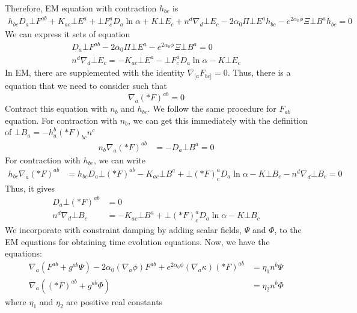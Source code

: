 \documentclass[prd]{revtex4}
\begin{document}
Therefore, EM equation with contraction $h_{bc}$ is
\begin{align}
\label{eqnem_h_contrac}
h_{bc} D_a \bot F^{ab}  + K_{ac} \bot E^a + \bot F_c^a D_a \ln \alpha + K \bot E_c + n^d \nabla_d \bot E_c -2 \alpha_0 \Pi \bot E^a h_{bc}- e^{2 \alpha_0 \phi} \Xi \bot B^a h_{bc}= 0
\end{align}
We can express it sets of equation
\begin{align}
D_a \bot F^{ab}  -2 \alpha_0 \Pi \bot E^a - e^{2 \alpha_0 \phi} \Xi \bot B^a = 0 \\
n^d \nabla_d \bot E_c = -K_{ac} \bot E^a - \bot F_c^a D_a \ln \alpha - K \bot E_c 
\end{align}
In EM, there are supplemented with the identity $\nabla_{[a} F_{bc]} = 0$. Thus, there is a equation that we need to consider such that
\begin{equation}
\nabla_a (\ast F)^{ab} = 0 
\end{equation}
Contract this equation with $n_b$ and $h_{bc}$. We follow the same procedure for $F_{ab}$ equation. For contraction with $n_b$, we can get this immediately with the definition of $\bot B_a = -h_a^b (\ast F)_{bc} n^c$
\begin{align}
\label{eqndualem}
n_b \nabla_a (\ast F)^{ab}  & = -D_a \bot B^a = 0
\end{align}
For contraction with $h_{bc}$, we can write
\begin{align}
\label{eqndualem2}
h_{bc} \nabla_a (\ast F)^{ab}  &=h_{bc} D_a \bot (\ast F)^{ab}  - K_{ac} \bot B^a + \bot (\ast F)_c^a D_a \ln \alpha - K \bot B_c - n^d \nabla_d \bot B_c = 0
\end{align}
Thus, it gives
\begin{align}
D_a \bot (\ast F)^{ab} &= 0 \\
n^d \nabla_d \bot B_c  &=- K_{ac} \bot B^a + \bot (\ast F)_c^a D_a \ln \alpha - K \bot B_c 
\end{align}
We incorporate with constraint damping by adding scalar fields, $\Psi$ and $\Phi$, to the EM equations for obtaining time evolution equations. Now, we have the equations:
\begin{align}
\label{eqnemconst1}
\nabla_a (F^{ab} + g^{ab} \Psi) - 2 \alpha_0 (\nabla_a \phi) F^{ab}  + e^{2 \alpha_0 \phi} (\nabla_a \kappa) (\ast F)^{ab} &= \eta_1 n^b \Psi  \\
\label{eqnemconst2}
\nabla_a ((\ast F)^{ab} + g^{ab} \Phi) &= \eta_2 n^b \Phi
\end{align}
where $\eta_1$ and $\eta_2$ are positive real constants
\end{document}
